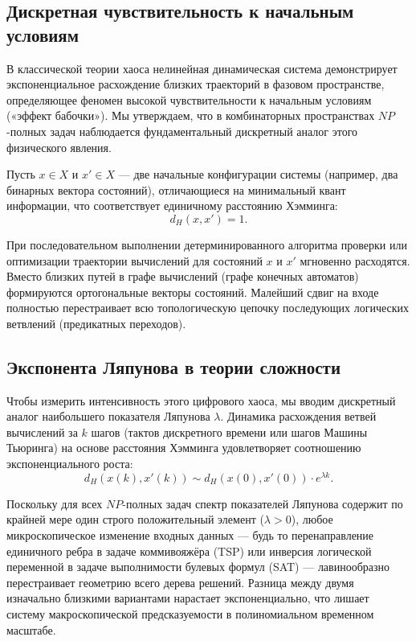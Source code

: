 \documentclass[12pt,a4paper]{article}
\begin{document}
\subsection{Дискретная чувствительность к начальным условиям}

В классической теории хаоса нелинейная динамическая система демонстрирует экспоненциальное расхождение близких траекторий в фазовом пространстве, определяющее феномен высокой чувствительности к начальным условиям («эффект бабочки»). Мы утверждаем, что в комбинаторных пространствах $NP$-полных задач наблюдается фундаментальный дискретный аналог этого физического явления.

Пусть $x \in X$ и $x' \in X$ — две начальные конфигурации системы (например, два бинарных вектора состояний), отличающиеся на минимальный квант информации, что соответствует единичному расстоянию Хэмминга:
\begin{equation}
d_H(x, x') = 1.
\end{equation}

При последовательном выполнении детерминированного алгоритма проверки или оптимизации траектории вычислений для состояний $x$ и $x'$ мгновенно расходятся. Вместо близких путей в графе вычислений (графе конечных автоматов) формируются ортогональные векторы состояний. Малейший сдвиг на входе полностью перестраивает всю топологическую цепочку последующих логических ветвлений (предикатных переходов).

\subsection{Экспонента Ляпунова в теории сложности}

Чтобы измерить интенсивность этого цифрового хаоса, мы вводим дискретный аналог наибольшего показателя Ляпунова $\lambda$. Динамика расхождения ветвей вычислений за $k$ шагов (тактов дискретного времени или шагов Машины Тьюринга) на основе расстояния Хэмминга удовлетворяет соотношению экспоненциального роста:
\begin{equation}
d_H(x(k), x'(k)) \sim d_H(x(0), x'(0)) \cdot e^{\lambda k}.
\end{equation}

Поскольку для всех $NP$-полных задач спектр показателей Ляпунова содержит по крайней мере один строго положительный элемент ($\lambda > 0$), любое микроскопическое изменение входных данных — будь то перенаправление единичного ребра в задаче коммивояжёра (TSP) или инверсия логической переменной в задаче выполнимости булевых формул (SAT) — лавинообразно перестраивает геометрию всего дерева решений. Разница между двумя изначально близкими вариантами нарастает экспоненциально, что лишает систему макроскопической предсказуемости в полиномиальном временном масштабе.
\end{document}
